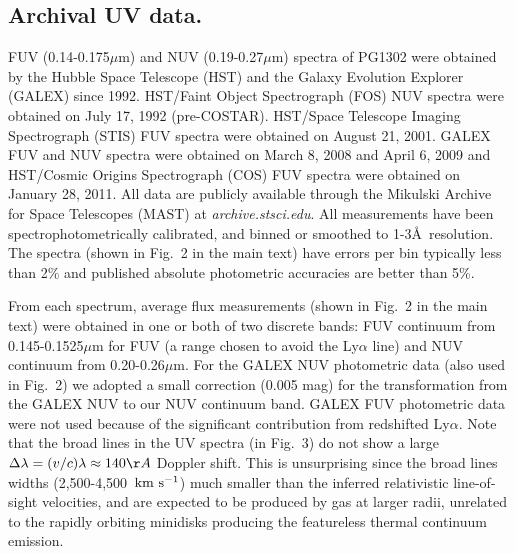 \subsection{Archival UV data.}

FUV (0.14-0.175$\mu$m) and NUV (0.19-0.27$\mu$m) spectra of PG1302
were obtained by the Hubble Space Telescope (HST) and the Galaxy
Evolution Explorer (GALEX) since 1992.  HST/Faint Object Spectrograph
(FOS) NUV spectra were obtained on July 17, 1992
(pre-COSTAR)\cite{EvansKoratkar2004}.  HST/Space Telescope Imaging
Spectrograph (STIS) FUV spectra were obtained on August 21,
2001\cite{Cooksey+2008}. GALEX FUV and NUV spectra were obtained on
March 8, 2008 and April 6, 2009 and HST/Cosmic Origins Spectrograph
(COS) FUV spectra were obtained on January 28, 2011. All data are
publicly available through the Mikulski Archive for Space Telescopes
(MAST) at {\it archive.stsci.edu}.  All measurements have been
spectrophotometrically calibrated, and binned or smoothed to
1-3\AA\ resolution.  The spectra (shown in Fig.~2 in the main text)
have errors per bin typically less than 2\% and published absolute
photometric accuracies are better than 5\%. 

From each spectrum, average flux measurements (shown in Fig.~2 in the
main text) were obtained in one or both of two discrete bands: FUV
continuum from 0.145-0.1525$\mu$m for FUV (a range chosen to avoid the
Ly$\alpha$ line) and NUV continuum from 0.20-0.26$\mu$m.  For the
GALEX NUV photometric data (also used in Fig.~2) we adopted a small
correction (0.005 mag) for the transformation from the GALEX NUV to
our NUV continuum band.  GALEX FUV photometric data were not used
because of the significant contribution from redshifted
Ly$\alpha$. Note that the broad lines in the UV spectra (in Fig.~3) do
not show a large $\Delta\lambda=(v/c)\lambda\approx 140\AA$ Doppler
shift. This is unsurprising since the broad lines widths
(2,500-4,500~${\rm km~s^{-1}}$) much smaller than the inferred
relativistic line-of-sight velocities, and are expected to be produced
by gas at larger radii, unrelated to the rapidly orbiting minidisks
producing the featureless thermal continuum emission\cite{PG1302-Dan}.

\vspace{2\baselineskip}


